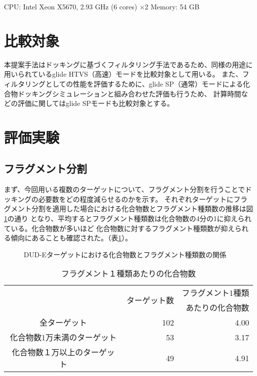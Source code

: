 CPU: Intel Xeon X5670, 2.93 GHz (6 cores) $\times$2
Memory: 54 GB



\section{比較対象}
本提案手法はドッキングに基づくフィルタリング手法であるため、同様の用途に用いられているglide HTVS（高速）モードを比較対象として用いる。
また、フィルタリングとしての性能を評価するために、glide SP（通常）モードによる化合物ドッキングシミュレーションと組み合わせた評価も行うため、
計算時間などの評価に関してはglide SPモードも比較対象とする。

\section{評価実験}

\subsection{フラグメント分割}\label{subsec:result_decomposition}
まず、今回用いる複数のターゲットについて、フラグメント分割を行うことでドッキングの必要数をどの程度減らせるのかを示す。
それぞれターゲットにフラグメント分割を適用した場合における化合物数とフラグメント種類数の推移は図\ref{fig:dude_decomposition}の通り
となり、平均するとフラグメント種類数は化合物数の4分の1に抑えられている。化合物数が多いほど
化合物数に対するフラグメント種類数が抑えられる傾向にあることも確認された。（表\ref{table:dude_decomposition}）。

\begin{figure}[htp]
 \begin{center}
  \caption{DUD-Eターゲットにおける化合物数とフラグメント種類数の関係}
  \label{fig:dude_decomposition}
 \end{center}
\end{figure}
\begin{table}[htb] \centering
	\caption{フラグメント１種類あたりの化合物数}
	\label{table:dude_decomposition}
	\begin{tabular}{c|rr|}
								&\multirow{2}{*}{ターゲット数}	&フラグメント1種類		\\
								&						&あたりの化合物数		\\ \hline
	全ターゲット					&102		&4.00							\\
	化合物数1万未満のターゲット		&53			&3.17							\\
	化合物数１万以上のターゲット	&49			&4.91							\\ \hline
	\end{tabular}
\end{table}


